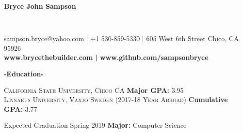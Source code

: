 \documentclass[12pt]{article}
\begin{document}
\sffamily
\lsstyle
\color{white}
\center
\begin{Huge}\textbf{Bryce John Sampson}\end{Huge}\\
\medskip
\fontsize{12}{1.2}
\selectfont
\smallbreak
\colorbox{accent}{
    \parbox{45em}{
        \centering
        \color{secondary}
        sampson.bryce@yahoo.com | +1 530-859-5330 | 605 West 6th Street Chico, CA 95926 \\
        \large
        \textbf{\color{primary}www.brycethebuilder.com |}
        \textbf{\color{primary}www.github.com/sampsonbryce}
    }
}
\smallskip
\center
\textbf{\Large-Education-}\\
\flushleft
\begin{footnotesize}
\textsc{California State University, Chico CA}
\hfill
\textbf{\color{primary}Major GPA: }3.95\\

\smallskip
\textsc{Linnaeus University, Vaxjo Sweden (2017-18 Year Abroad)}
\hfill
\textbf{\color{primary}Cumulative GPA: }3.77\\
\smallskip

{\color{accent}Expected Graduation Spring 2019}
\hfill
\textbf{\color{primary}Major: }Computer Science\\
\smallskip

\end{footnotesize}
\end{document}

